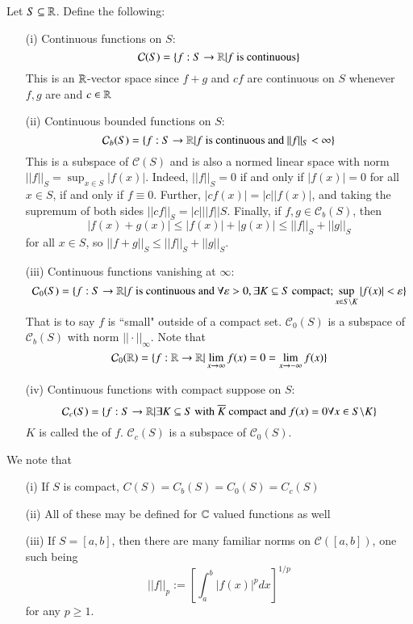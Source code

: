 \begin{example}
    Let $S \subseteq \mathbb R$. Define the following: \begin{itemize}
        \item[(i)] Continuous functions on $S$: $$\mathcal{C}(S) = \left\{f:S\rightarrow \mathbb R\vert f\text{ is continuous}\right\}$$ This is an $\mathbb R$-vector space since $f+g$ and $cf$ are continuous on $S$ whenever $f,g$ are and $c \in \mathbb R$
        \item[(ii)] Continuous bounded functions on $S$: $$\mathcal{C}_b(S) = \{f:S\rightarrow \mathbb R\vert f\text{ is continuous and }||f||_S < \infty\}$$ This is a subspace of $\mathcal{C}(S)$ and is also a normed linear space with norm $||f||_S = \sup_{x\in S}|f(x)|$. Indeed, $||f||_S = 0$ if and only if $|f(x)| = 0$ for all $x \in S$, if and only if $f \equiv 0$. Further, $|cf(x)| = |c||f(x)|$, and taking the supremum of both sides $||cf||_S = |c|||f||S$. Finally, if $f,g \in \mathcal{C}_b(S)$, then $$|f(x) + g(x)| \leq |f(x)| + |g(x)| \leq ||f||_S+||g||_S$$ for all $x \in S$, so $||f+g||_S \leq ||f||_S + ||g||_S$.
        \item[(iii)] Continuous functions vanishing at $\infty$: $$\mathcal{C}_0(S) = \{f:S\rightarrow \mathbb R\vert f\text{ is continuous and }\forall \varepsilon > 0,\exists K \subseteq S\text{ compact}; \sup_{x\in S\backslash K}|f(x)| < \varepsilon\}$$ That is to say $f$ is ``small" outside of a compact set. $\mathcal{C}_0(S)$ is a subspace of $\mathcal{C}_b(S)$ with norm $||\cdot||_{\infty}$. Note that $$\mathcal{C}_0(\mathbb R) = \{f:\mathbb R\rightarrow \mathbb R\vert\lim\limits_{x\rightarrow \infty}f(x) = 0 = \lim\limits_{x\rightarrow -\infty}f(x)\}$$
        \item[(iv)] Continuous functions with compact suppose on $S$: $$\mathcal{C}_c(S) = \{f:S\rightarrow \mathbb R\vert \exists K \subseteq S\text{ with }\overline{K}\text{ compact and }f(x) = 0\forall x \in S\backslash K\}$$ $K$ is called the  of $f$. $\mathcal{C}_c(S)$ is a subspace of $\mathcal{C}_0(S)$.
    \end{itemize}
\end{example}

\begin{remark}
    We note that \begin{itemize}
        \item[(i)] If $S$ is compact, $C(S) = C_b(S) = C_0(S) = C_c(S)$
        \item[(ii)] All of these may be defined for $\mathbb C$ valued functions as well
        \item[(iii)] If $S = [a,b]$, then there are many familiar norms on $\mathcal{C}([a,b])$, one such being $$||f||_p := \left[\int_a^b|f(x)|^pdx\right]^{1/p}$$ for any $p\geq 1$.
    \end{itemize}
\end{remark}

